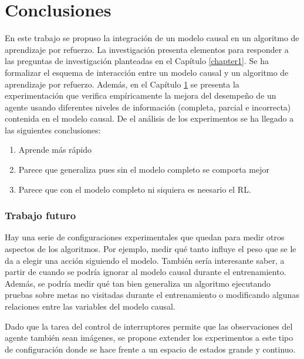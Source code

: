 \chapter{Conclusiones}\label{chapter5}

\graphicspath{{Chapter5/Figs/}}

En este trabajo se propuso la integración de un modelo causal en un
algoritmo de aprendizaje por refuerzo.
La investigación presenta
elementos para responder a las preguntas de investigación planteadas en el Capítulo \ref{chapter1}.
Se ha formalizar el esquema 
    de interacción entre
    un modelo causal y un algoritmo de aprendizaje por
    refuerzo.
    Además, en el Capítulo \ref{chapter5} se presenta la experimentación que verifica empíricamente
    la mejora del desempeño de un agente usando diferentes niveles de información (completa, parcial e incorrecta) contenida en el modelo causal. De el análisis de los experimentos 
    se ha llegado a las siguientes conclusiones:
    
\begin{enumerate}
    \item Aprende más rápido 
    \item Parece que generaliza pues sin el modelo completo se
    comporta mejor
    \item Parece que con el modelo completo ni siquiera es 
    neesario el RL.
\end{enumerate}
\subsection{Trabajo futuro}

Hay una serie de configuraciones experimentales que quedan 
para medir otros aspectos de los algoritmos. Por ejemplo,
medir qué tanto influye el peso que se le da a elegir una 
acción siguiendo el modelo. También sería interesante saber,
a partir de cuando se podría ignorar al modelo causal durante el entrenamiento. Además,
se podría medir qué tan bien generaliza un algoritmo
ejecutando pruebas sobre metas no visitadas durante el entrenamiento
o modificando algunas relaciones entre las variables del modelo causal.

Dado que la tarea del control de interruptores  permite
que las observaciones del agente también sean imágenes,
se propone extender los experimentos a este tipo de configuración
donde se hace frente a un espacio de estados grande y continuo.

